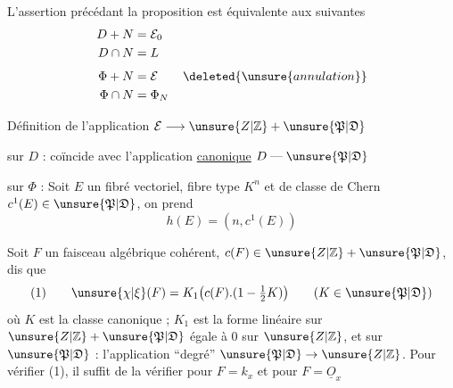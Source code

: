 L'assertion précédant la proposition est équivalente aux suivantes
\[
\begin{aligned}
D+N&=\mathcal E_0\\
D\cap N&=L\\[4pt]
\Phi+N&=\mathcal E\qquad\deleted{\unsure{annulation}}\\
\Phi\cap N&=\Phi_N
\end{aligned}
\]

Définition de l'application $\mathcal E\longrightarrow \unsure{Z|\mathbb Z}+\unsure{\mathfrak P|\mathfrak D}$

sur $D$ : coïncide avec l'application \uline{canonique} $D\mathrel{\text{---}}\unsure{\mathfrak P|\mathfrak D}$

sur $\Phi$ : Soit $E$ un fibré vectoriel, fibre type $K^n$ et de classe de Chern
$c^1(E)\in\unsure{\mathfrak P|\mathfrak D}$, on prend
\[
h(E)=(n,c^1(E))
\]

Soit $F$ un faisceau algébrique cohérent, $c(F)\in \unsure{Z|\mathbb Z}+\unsure{\mathfrak P|\mathfrak D}$,
 dis que
\[
(1)\qquad \unsure{\chi|\xi}(F)=K_1\bigl(c(F).(1-\tfrac12 K)\bigr)
\qquad (K\in\unsure{\mathfrak P|\mathfrak D})
\]
où $K$ est la classe canonique ; $K_1$ est la forme linéaire sur
$\unsure{Z|\mathbb Z}+\unsure{\mathfrak P|\mathfrak D}$ égale à $0$ sur $\unsure{Z|\mathbb Z}$, et sur
$\unsure{\mathfrak P|\mathfrak D}$ : l'application ``degré''
$\unsure{\mathfrak P|\mathfrak D}\to \unsure{Z|\mathbb Z}$.
Pour vérifier (1), il suffit de la vérifier pour $F=k_x$ et pour $F=\underline O_x$



